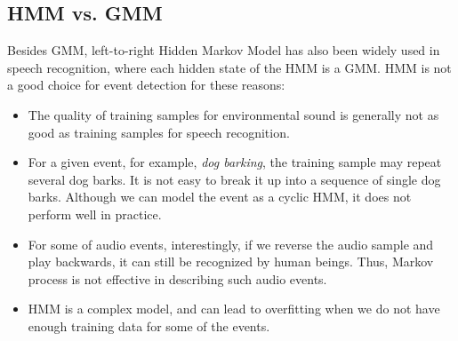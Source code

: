 \subsection{HMM vs. GMM}
Besides GMM, left-to-right Hidden Markov Model has also been widely
used in speech recognition, where each hidden state of the HMM is a GMM.
HMM is not a good choice for event detection for these reasons:
\begin{itemize}
\item The quality of training samples for environmental sound
is generally not as good as training samples for speech recognition.
\item For a given event, for example, {\em dog barking},
the training sample may repeat several dog barks.
It is not easy to break it up into a sequence of single dog barks.
Although we can model the event as a cyclic HMM,
it does not perform well in practice.
\item For some of audio events, interestingly, if we reverse the audio
sample and play backwards, it can still be recognized by human beings.
Thus, Markov process is not effective in describing such audio events.
\item HMM is a complex model, and can lead to overfitting when we do not
have enough training data for some of the events.
\end{itemize}

